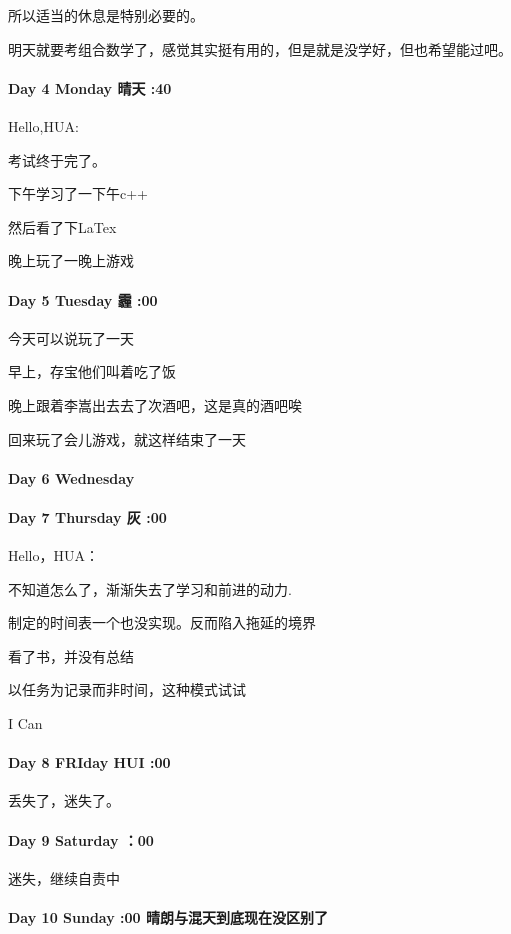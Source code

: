 \documentclass[UTF8,a4paper,8pt]{ctexbook}
\begin{document}
		 所以适当的休息是特别必要的。
		 
		 明天就要考组合数学了，感觉其实挺有用的，但是就是没学好，但也希望能过吧。
	 \paragraph{Day 4   Monday      \quad    晴天 :40 }
	 
		 Hello,HUA:
	 
		 考试终于完了。
		 
		 下午学习了一下午c++
	 
		 然后看了下LaTex 
	 
		 晚上玩了一晚上游戏
	 \paragraph{Day 5   Tuesday     \quad   霾 :00  }
	 
		 今天可以说玩了一天
	 
		 早上，存宝他们叫着吃了饭
		 
		 晚上跟着李嵩出去去了次酒吧，这是真的酒吧唉
	 
		 回来玩了会儿游戏，就这样结束了一天
	 \paragraph{Day 6   Wednesday   \quad     }
	 \paragraph{Day 7   Thursday    \quad    灰 :00 }
		 Hello，HUA：
	 
		 不知道怎么了，渐渐失去了学习和前进的动力.
		 
		 制定的时间表一个也没实现。反而陷入拖延的境界
		 
		 看了书，并没有总结
		 
		 以任务为记录而非时间，这种模式试试
		 
		 I Can
	 \paragraph{Day 8   FRIday    \quad    HUI :00 }
	 
		 丢失了，迷失了。
	 \paragraph{Day 9   Saturday  ：00 }
		 迷失，继续自责中
	 \paragraph{Day 10  Sunday :00   \quad   晴朗与混天到底现在没区别了}
	 
\end{document}
